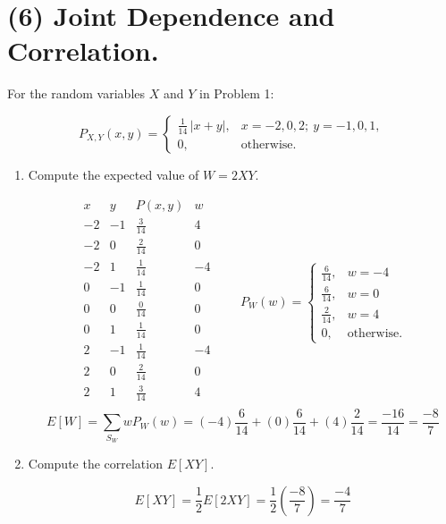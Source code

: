 \documentclass[12pt]{article}
\newenvironment{bluetext}
    {\par\begingroup\color{blue}\parindent=0pt\ignorespaces}
    {\par\endgroup\noindent\ignorespacesafterend}
\begin{document}
\section*{(6) Joint Dependence and Correlation.}

For the random variables $X$ and $Y$ in Problem 1:
\begin{bluetext}
    \[
P_{X,Y}(x,y) =
\begin{cases}
\frac{1}{14}\,|x+y|, & x = -2, 0, 2;~ y = -1, 0, 1, \\
0, & \text{otherwise.}
\end{cases}
\]
\end{bluetext}
\begin{enumerate}
    \item[(a)] Compute the expected value of $W = 2XY$.
        \begin{bluetext}
        \[
        \begin{array}{c|c|c|c}
x & y & P(x,y) & w \\ \hline
-2 & -1 & \frac{3}{14} & 4 \\[4pt]
-2 & 0 & \frac{2}{14} & 0 \\[4pt]
-2 & 1 & \frac{1}{14} & -4 \\[4pt]
0  & -1 & \frac{1}{14} & 0 \\[4pt]
0  & 0 & \frac{0}{14} & 0 \\[4pt]
0  & 1 & \frac{1}{14} & 0 \\[4pt]
2  & -1 & \frac{1}{14} & -4 \\[4pt]
2  & 0 & \frac{2}{14} & 0 \\[4pt]
2  & 1 & \frac{3}{14} & 4 \\
\end{array}\qquad
        P_{W}(w)=
        \begin{cases}
        \frac{6}{14}, & w=-4\\
        \frac{6}{14}, & w=0\\
        \frac{2}{14}, & w=4  \\
        0, & \text{otherwise.}
        \end{cases}
        \]
            \[
            E[W]=\sum_{S_{W}}wP_{W}(w)=\left(-4\right)\frac{6}{14}+\left(0\right)\frac{6}{14}+\left(4\right)\frac{2}{14}=\frac{-16}{14}=\frac{-8}{7}
            \]
        \end{bluetext}
    \item[(b)] Compute the correlation $E[XY]$.
    \begin{bluetext}
        \[
                E[XY]=\frac{1}{2}E[2XY]=\frac{1}{2}\left(\frac{-8}{7}\right)=\frac{-4}{7}
\]
\end{bluetext}
\end{enumerate}
\end{document}
